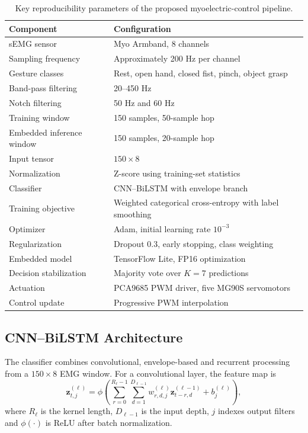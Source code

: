 \documentclass[technologies,article,submit,pdftex,moreauthors]{Definitions/mdpi}
\begin{document}
\begin{table}[H]
\centering
\caption{Key reproducibility parameters of the proposed myoelectric-control pipeline.\label{tab:reproducibility_parameters}}
\begin{tabularx}{0.94\linewidth}{lX}
\toprule
\textbf{Component} & \textbf{Configuration} \\
\midrule
sEMG sensor & Myo Armband, 8 channels \\
Sampling frequency & Approximately 200 Hz per channel \\
Gesture classes & Rest, open hand, closed fist, pinch, object grasp \\
Band-pass filtering & 20--450 Hz \\
Notch filtering & 50 Hz and 60 Hz \\
Training window & 150 samples, 50-sample hop \\
Embedded inference window & 150 samples, 20-sample hop \\
Input tensor & $150 \times 8$ \\
Normalization & Z-score using training-set statistics \\
Classifier & CNN--BiLSTM with envelope branch \\
Training objective & Weighted categorical cross-entropy with label smoothing \\
Optimizer & Adam, initial learning rate $10^{-3}$ \\
Regularization & Dropout 0.3, early stopping, class weighting \\
Embedded model & TensorFlow Lite, FP16 optimization \\
Decision stabilization & Majority vote over $K=7$ predictions \\
Actuation & PCA9685 PWM driver, five MG90S servomotors \\
Control update & Progressive PWM interpolation \\
\bottomrule
\end{tabularx}
\end{table}

\subsection{CNN--BiLSTM Architecture}

The classifier combines convolutional, envelope-based and recurrent processing from a $150 \times 8$ EMG window. For a convolutional layer, the feature map is
\begin{equation}
    \label{eq:conv1d}
    \mathbf{z}^{(\ell)}_{t,j}
    =
    \phi
    \left(
    \sum_{r=0}^{R_{\ell}-1}
    \sum_{d=1}^{D_{\ell-1}}
    w^{(\ell)}_{r,d,j}
    \mathbf{z}^{(\ell-1)}_{t-r,d}
    + b^{(\ell)}_{j}
    \right),
\end{equation}
where $R_{\ell}$ is the kernel length, $D_{\ell-1}$ is the input depth, $j$ indexes output filters and $\phi(\cdot)$ is ReLU after batch normalization.
\end{document}
